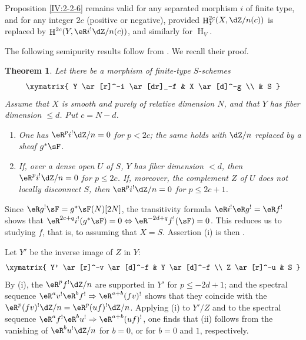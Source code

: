 \documentclass[12pt,oneside,english]{smfbook}
\DeclareMathOperator{\h}{H}
\newtheorem{theorem}[subsubsection]{Theorem}
\begin{document}
Proposition \ref{IV:2-2-6} remains valid for any separated morphism $i$ of finite type, and for any integer $2c$ (positive or negative), provided $\h_Y^{2c}(X,\dZ/n(c))$ is replaced by $\h^{2c}(Y,\eR i^!\dZ/n(c))$, and similarly for $\h_V$.

The following semipurity results follow from \cite[1.8, 1.10, 1.15]{sga2}. We recall their proof.

\begin{theorem}\label{IV:2-2-8}
Let there be a morphism of finite-type $S$-schemes
\[\xymatrix{
  Y \ar[r]^-i \ar[dr]_-f
    & X \ar[d]^-g \\
  & S
}\]
Assume that $X$ is smooth and purely of relative dimension $N$, and that $Y$ has fiber dimension $\leqslant d$. Put $c=N-d$.
\begin{enumerate}[\indent (i)]
  \item One has $\eR^pi^!\dZ/n=0$ for $p<2c$; the same holds with $\dZ/n$ replaced by a sheaf $g^*\sF$.
  \item If, over a dense open $U$ of $S$, $Y$ has fiber dimension $<d$, then $\eR^pi^!\dZ/n=0$ for $p\leqslant2c$. If, moreover, the complement $Z$ of $U$ does not locally disconnect $S$, then $\eR^pi^!\dZ/n=0$ for $p\leqslant2c+1$.
\end{enumerate}
\end{theorem}

Since $\eR g^!\sF=g^*\sF(N)[2N]$, the transitivity formula $\eR i^!\eR g^!=\eR f^!$ shows that $\eR^{2c+q}i^!(g^*\sF)=0\Leftrightarrow\eR^{-2d+q}f^!(\sF)=0$. This reduces us to studying $f$, that is, to assuming that $X=S$. Assertion (i) is then \cite[XVIII 3.17]{sga4}.

Let $Y'$ be the inverse image of $Z$ in $Y$:
\[\xymatrix{
  Y' \ar[r]^-v \ar[d]^-f
    & Y \ar[d]^-f \\
  Z \ar[r]^-u
    & S
}\]
By (i), the $\eR^pf^!\dZ/n$ are supported in $Y'$ for $p\leqslant-2d+1$; and the spectral sequence $\eR^av^!\eR^bf^!\Rightarrow\eR^{a+b}(fv)^!$ shows that they coincide with the $\eR^p(fv)^!\dZ/n=\eR^p(uf)^!\dZ/n$. Applying (i) to $Y'/Z$ and to the spectral sequence $\eR^af^!\eR^bu^!\Rightarrow\eR^{a+b}(uf)^!$, one finds that (ii) follows from the vanishing of $\eR^bu^!\dZ/n$ for $b=0$, or for $b=0$ and $1$, respectively.

\subsubsection{}\label{IV:2-2-9}
\end{document}
